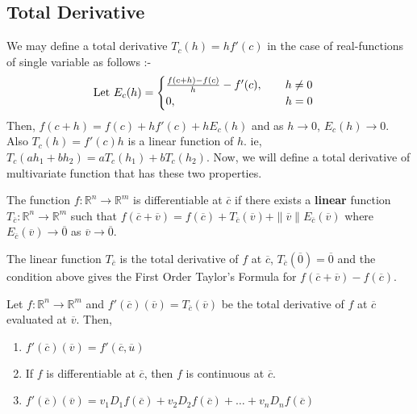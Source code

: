 \subsection{Total Derivative}
	We may define a total derivative \( T_c(h) = hf'(c) \) in the case of real-functions of single variable as follows :-\\

	\[ \text{Let }E_c(h) = \begin{cases} \frac{f(c+h)-f(c)}{h} - f'(c),\qquad h \ne 0 \\ 0,\hspace{3.4cm} h = 0 \end{cases} \]
		Then, \( f(c+h) = f(c) + hf'(c) + hE_c(h) \) and as \( h \to 0 \), \( E_c(h) \to 0\).
		Also \( T_c(h) = f'(c)h \) is a linear function of $h$.
		ie, \( T_c(ah_1+bh_2) = aT_c(h_1)+bT_c(h_2) \).
		Now, we will define a total derivative of multivariate function that has these two properties.

\begin{definition}
	The function \( f: \mathbb{R}^n \to \mathbb{R}^m \) is differentiable at $\overline{c}$ if there exists a \textbf{linear} function \( T_{\overline{c}} : \mathbb{R}^n \to \mathbb{R}^m \) such that \( f(\overline{c}+\overline{v}) = f(\overline{c}) + T_{\overline{c}}(\overline{v}) + \|\overline{v}\| E_{\overline{c}}(\overline{v}) \) where \( E_{\overline{c}}(\overline{v}) \to \overline{0} \) as \( \overline{v} \to \overline{0} \).
\end{definition}

	The linear function $T_{\overline{c}}$ is the total derivative of $f$ at $\overline{c}$, \( T_{\overline{c}}(\overline{0}) = \overline{0} \) and the condition above gives the First Order Taylor's Formula for \( f(\overline{c}+\overline{v})-f(\overline{c}) \).

\begin{remark}[Properties] Let \( f : \mathbb{R}^n \to \mathbb{R}^m \) and \( f'(\overline{c})(\overline{v}) = T_{\overline{c}}(\overline{v}) \) be the total derivative of $f$ at $\overline{c}$ evaluated at $\overline{v}$.
	Then, 
	\begin{enumerate}
		\item \( f'(\overline{c})(\overline{v}) = f'(\overline{c},\overline{u}) \)
		\item If $f$ is differentiable at $\overline{c}$, then $f$ is continuous at $\overline{c}$.
		\item \( f'(\overline{c})(\overline{v}) = v_1 D_1 f(\overline{c}) + v_2 D_2 f(\overline{c}) + \dots + v_n D_n f(\overline{c}) \)
	\end{enumerate}
\end{remark}

